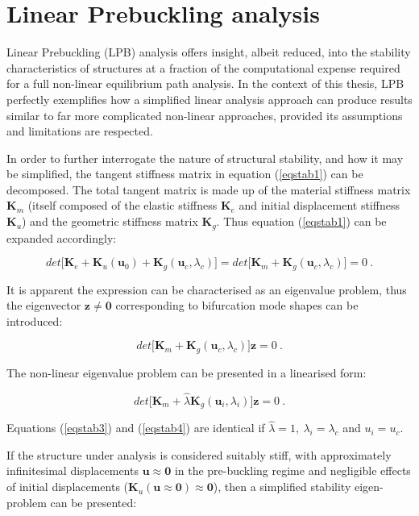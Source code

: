 \section{Linear Prebuckling analysis}
Linear Prebuckling (LPB) analysis offers insight, albeit reduced, into the stability characteristics of structures at a fraction of the computational expense required for a full non-linear equilibrium path analysis. In the context of this thesis, LPB perfectly exemplifies how a simplified linear analysis approach can produce results similar to far more complicated non-linear approaches, provided its assumptions and limitations are respected.

In order to further interrogate the nature of structural stability, and how it may be simplified, the tangent stiffness matrix in equation (\ref{eqstab1}) can be decomposed. The total tangent matrix is made up of the material stiffness matrix $\mathbf{K}_m$ (itself composed of the elastic stiffness $\mathbf{K}_e$ and initial displacement stiffness $\mathbf{K}_u$) and the geometric stiffness matrix $\mathbf{K}_g$. Thus equation (\ref{eqstab1}) can be expanded accordingly:

\begin{equation} 
det\big[
\mathbf{K}_e +
\mathbf{K}_u(\mathbf{u}_0) +
\mathbf{K}_g(\mathbf{u}_c,\lambda_c)
\big] = 
det\big[
\mathbf{K}_m +
\mathbf{K}_g(\mathbf{u}_c,\lambda_c)
\big] = 0
\label{eqstab2}\ .
\end{equation}

It is apparent the expression can be characterised as an eigenvalue problem, thus the eigenvector $\mathbf{z} \neq \mathbf{0}$ corresponding to bifurcation mode shapes can be introduced:

\begin{equation} 
det\big[
\mathbf{K}_m +
\mathbf{K}_g(\mathbf{u}_c,\lambda_c)
\big]\mathbf{z} = 0
\label{eqstab3}\ .
\end{equation}

The non-linear eigenvalue problem can be presented in a linearised form:

\begin{equation} 
det\big[
\mathbf{K}_m +
\hat{\lambda}
\mathbf{K}_g(\mathbf{u}_i,\lambda_i)
\big]\mathbf{z} = 0
\label{eqstab4}\ .
\end{equation}

Equations (\ref{eqstab3}) and (\ref{eqstab4}) are identical if $\hat{\lambda}
 = 1,\ \lambda_i = \lambda_c$ and $u_i = u_c$.
 
 If the structure under analysis is considered suitably stiff, with approximately infinitesimal displacements $\mathbf{u} \approx \mathbf{0}$ in the pre-buckling regime and negligible effects of initial displacements ($\mathbf{K}_u(\mathbf{u} \approx \mathbf{0}) \approx \mathbf{0}$), then a simplified stability eigen-problem can be presented:
 
